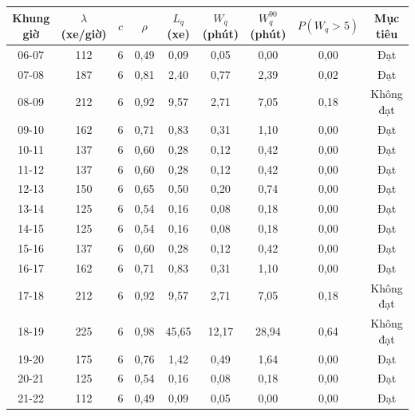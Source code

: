 \begin{tabular}{ccccccccc}
\toprule
\textbf{Khung giờ} & \textbf{$\lambda$ (xe/giờ)} & \textbf{$c$} & \textbf{$\rho$} & \textbf{$L_q$ (xe)} & \textbf{$W_q$ (phút)} & \textbf{$W_q^{90}$ (phút)} & \textbf{$P(W_q{>}5)$} & \textbf{Mục tiêu} \\
\midrule
06-07 & 112 & 6 & 0{,}49 & 0{,}09 & 0{,}05 & 0{,}00 & 0{,}00 & Đạt \\
07-08 & 187 & 6 & 0{,}81 & 2{,}40 & 0{,}77 & 2{,}39 & 0{,}02 & Đạt \\
08-09 & 212 & 6 & 0{,}92 & 9{,}57 & 2{,}71 & 7{,}05 & 0{,}18 & Không đạt \\
09-10 & 162 & 6 & 0{,}71 & 0{,}83 & 0{,}31 & 1{,}10 & 0{,}00 & Đạt \\
10-11 & 137 & 6 & 0{,}60 & 0{,}28 & 0{,}12 & 0{,}42 & 0{,}00 & Đạt \\
11-12 & 137 & 6 & 0{,}60 & 0{,}28 & 0{,}12 & 0{,}42 & 0{,}00 & Đạt \\
12-13 & 150 & 6 & 0{,}65 & 0{,}50 & 0{,}20 & 0{,}74 & 0{,}00 & Đạt \\
13-14 & 125 & 6 & 0{,}54 & 0{,}16 & 0{,}08 & 0{,}18 & 0{,}00 & Đạt \\
14-15 & 125 & 6 & 0{,}54 & 0{,}16 & 0{,}08 & 0{,}18 & 0{,}00 & Đạt \\
15-16 & 137 & 6 & 0{,}60 & 0{,}28 & 0{,}12 & 0{,}42 & 0{,}00 & Đạt \\
16-17 & 162 & 6 & 0{,}71 & 0{,}83 & 0{,}31 & 1{,}10 & 0{,}00 & Đạt \\
17-18 & 212 & 6 & 0{,}92 & 9{,}57 & 2{,}71 & 7{,}05 & 0{,}18 & Không đạt \\
18-19 & 225 & 6 & 0{,}98 & 45{,}65 & 12{,}17 & 28{,}94 & 0{,}64 & Không đạt \\
19-20 & 175 & 6 & 0{,}76 & 1{,}42 & 0{,}49 & 1{,}64 & 0{,}00 & Đạt \\
20-21 & 125 & 6 & 0{,}54 & 0{,}16 & 0{,}08 & 0{,}18 & 0{,}00 & Đạt \\
21-22 & 112 & 6 & 0{,}49 & 0{,}09 & 0{,}05 & 0{,}00 & 0{,}00 & Đạt \\
\bottomrule
\end{tabular}
